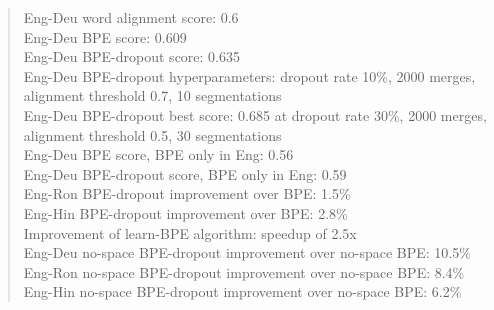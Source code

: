 \begin{quote}
    Eng-Deu word alignment score: 0.6\\
    Eng-Deu BPE score: 0.609\\
    Eng-Deu BPE-dropout score: 0.635\\
    Eng-Deu BPE-dropout hyperparameters: dropout rate 10\%, 2000 merges, alignment threshold 0.7, 10 segmentations\\
    Eng-Deu BPE-dropout best score: 0.685 at dropout rate 30\%, 2000 merges, alignment threshold 0.5, 30 segmentations\\
    Eng-Deu BPE score, BPE only in Eng: 0.56\\
    Eng-Deu BPE-dropout score, BPE only in Eng: 0.59\\
    Eng-Ron BPE-dropout improvement over BPE: 1.5\%\\
    Eng-Hin BPE-dropout improvement over BPE: 2.8\%\\
    Improvement of learn-BPE algorithm: speedup of 2.5x\\
    Eng-Deu no-space BPE-dropout improvement over no-space BPE: 10.5\%\\
    Eng-Ron no-space BPE-dropout improvement over no-space BPE: 8.4\%\\
    Eng-Hin no-space BPE-dropout improvement over no-space BPE: 6.2\%\\
\end{quote}
